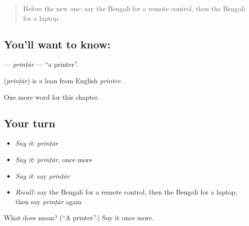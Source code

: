 \begin{quote}
Before the new one: say the Bengali for a remote control, then the Bengali for a laptop.
\end{quote}

\subsection*{You'll want to know: }
\textbf{} — \emph{prinṭār} — \textquotedblleft{}a printer\textquotedblright{}.

\begin{cousinweb}
\textbf{} (\emph{prinṭār}) is a loan from English \emph{printer}.
\end{cousinweb}

\begin{grammarlens}[title={What you've built}]
One more word for this chapter.
\end{grammarlens}

\subsection*{Your turn}
\begin{itemize}
\raggedright
  \item \emph{Say it:} \emph{prinṭār}
  \item \emph{Say it:} \emph{prinṭār}, once more
  \item \emph{Say it:} say \emph{prinṭār}
  \item \emph{Recall:} say the Bengali for a remote control, then the Bengali for a laptop, then say \emph{prinṭār} again
\end{itemize}

\begin{tcolorbox}[breakable,colback=teal!4,colframe=teal!35!black,title={Before you move on}]
What does  mean? (\textquotedblleft{}A printer\textquotedblright{}.) Say it once more.
\end{tcolorbox}
